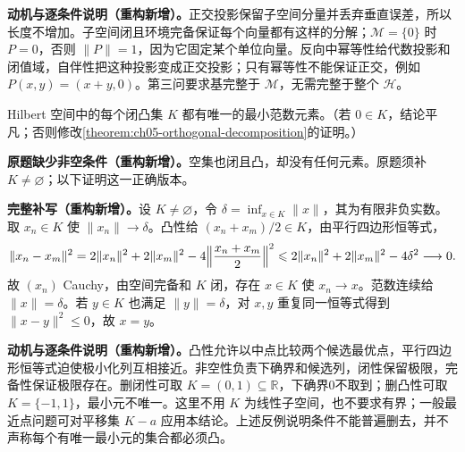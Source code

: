 \documentclass[../../main.tex]{subfiles}
\begin{document}
\begin{remark}
\textbf{动机与逐条件说明（重构新增）。}正交投影保留子空间分量并丢弃垂直误差，所以长度不增加。子空间闭且环境完备保证每个向量都有这样的分解；$\mathscr M=\{0\}$ 时 $P=0$，否则 $\|P\|=1$，因为它固定某个单位向量。反向中幂等性给代数投影和闭值域，自伴性把这种投影变成正交投影；只有幂等性不能保证正交，例如 $P(x,y)=(x+y,0)$。第三问要求基完整于 $\mathscr M$，无需完整于整个 $\mathscr H$。
\end{remark}
\begin{exercise}\label{exercise:ch05-minimal-convex-norm}
Hilbert 空间中的每个闭凸集 $K$ 都有唯一的最小范数元素。（若 $0\in K$，结论平凡；否则修改\cref{theorem:ch05-orthogonal-decomposition}的证明。）
\end{exercise}
\begin{remark}
\textbf{原题缺少非空条件（重构新增）。}空集也闭且凸，却没有任何元素。原题须补 $K\ne\varnothing$；以下证明这一正确版本。
\end{remark}
\begin{solution}
\textbf{完整补写（重构新增）。}设 $K\ne\varnothing$，令 $\delta=\inf_{x\in K}\|x\|$，其为有限非负实数。取 $x_n\in K$ 使 $\|x_n\|\to\delta$。凸性给 $(x_n+x_m)/2\in K$，由平行四边形恒等式，
\begin{align*}
\|x_n-x_m\|^2
=2\|x_n\|^2+2\|x_m\|^2-4\Bigl\|\frac{x_n+x_m}{2}\Bigr\|^2
\leqslant2\|x_n\|^2+2\|x_m\|^2-4\delta^2\longrightarrow0.
\end{align*}
故 $(x_n)$ Cauchy，由空间完备和 $K$ 闭，存在 $x\in K$ 使 $x_n\to x$。范数连续给 $\|x\|=\delta$。若 $y\in K$ 也满足 $\|y\|=\delta$，对 $x,y$ 重复同一恒等式得到 $\|x-y\|^2\leqslant0$，故 $x=y$。
\end{solution}
\begin{remark}
\textbf{动机与逐条件说明（重构新增）。}凸性允许以中点比较两个候选最优点，平行四边形恒等式迫使极小化列互相接近。非空性负责下确界和候选列，闭性保留极限，完备性保证极限存在。删闭性可取 $K=(0,1)\subseteq\mathbb R$，下确界0不取到；删凸性可取 $K=\{-1,1\}$，最小元不唯一。这里不用 $K$ 为线性子空间，也不要求有界；一般最近点问题可对平移集 $K-a$ 应用本结论。上述反例说明条件不能普遍删去，并不声称每个有唯一最小元的集合都必须凸。
\end{remark}
\end{document}
